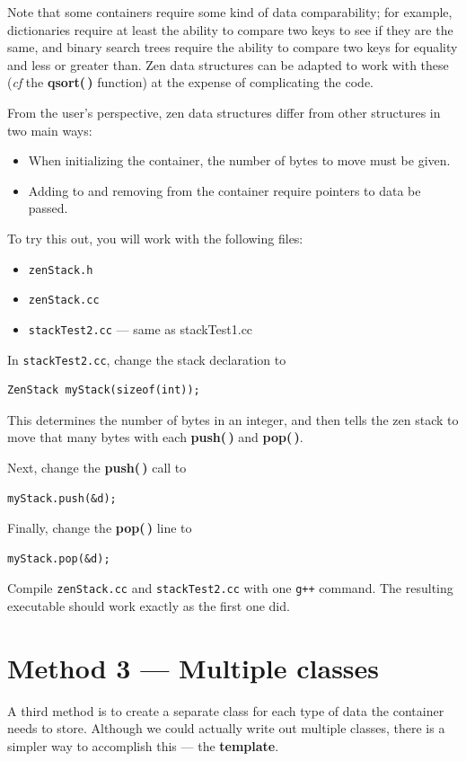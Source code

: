 \documentclass{article}
\begin{document}
Note that some containers require some kind of data comparability; for example,
dictionaries require at least the ability to compare two keys to see if they are
the same, and binary search trees require the ability to compare two keys for
equality and less or greater than. Zen data structures can be adapted to work
with these (\emph{cf} the {\bf qsort(\,)} function) at the expense of
complicating the code.\parend

From the user's perspective, zen data structures differ from other structures in
two main ways:
\begin{itemize}
  \item When initializing the container, the number of bytes to move must be
  given.
  \item Adding to and removing from the container require pointers to data be
  passed.
\end{itemize}

To try this out, you will work with the following files:
\begin{itemize}
  \item {\tt zenStack.h}
  \item {\tt zenStack.cc}
  \item {\tt stackTest2.cc} --- same as stackTest1.cc
\end{itemize}
\newpage
In {\tt stackTest2.cc}, change the stack declaration to
\begin{lstlisting}
ZenStack myStack(sizeof(int));
\end{lstlisting}
This determines the number of bytes in an integer, and then tells the zen stack
to move that many bytes with each {\bf push(\,)} and {\bf pop(\,)}.\parend

Next, change the {\bf push(\,)} call to
\begin{lstlisting}
myStack.push(&d);
\end{lstlisting}
\vskip6pt
Finally, change the {\bf pop(\,)} line to
\begin{lstlisting}
myStack.pop(&d);
\end{lstlisting}
\vskip6pt
Compile {\tt zenStack.cc} and {\tt stackTest2.cc} with one {\tt g++} command.
The resulting executable should work exactly as the first one did.

\section{Method 3 --- Multiple classes}
A third method is to create a separate class for each type of data the container
needs to store. Although we could actually write out multiple classes, there is
a simpler way to accomplish this --- the {\bf template}.\parend
\end{document}
